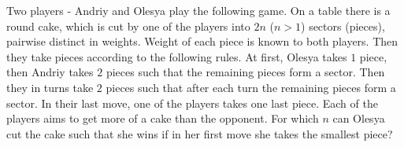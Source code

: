 Two players - Andriy and Olesya play the following game. On a table there is a round cake, which is cut by one of the players into $2n$ ($n>1$) sectors (pieces), pairwise distinct in weights. Weight of each piece is known to both players. Then they take pieces according to the following rules. At first, Olesya takes $1$ piece, then Andriy takes $2$ pieces such that the remaining pieces form a sector. Then they in turns take $2$ pieces such that after each turn the remaining pieces form a sector. In their last move, one of the players takes one last piece. Each of the players aims to get more of a cake than the opponent. For which $n$ can Olesya cut the cake such that she wins if in her first move she takes the smallest piece?
